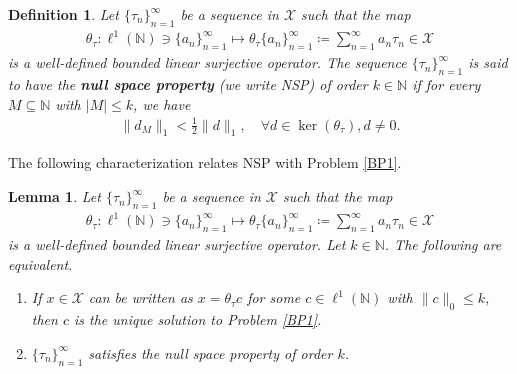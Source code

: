 \documentclass{amsart}
\newtheorem{definition}[theorem]{Definition}
\newtheorem{lemma} [theorem]{Lemma}
\begin{document}
\begin{definition}
Let $\{\tau_n \}_{n=1}^\infty$ be a sequence in  $\mathcal{X}$ such that the map 
\begin{align*}
	\theta_\tau:\ell^1(\mathbb{N})\ni \{a_n \}_{n=1}^\infty\mapsto \theta_\tau \{a_n \}_{n=1}^\infty\coloneqq \sum_{n=1}^{\infty}a_n\tau_n \in \mathcal{X} 
\end{align*}
is a well-defined bounded linear surjective operator. The sequence $\{\tau_n \}_{n=1}^\infty$  is said to have the \textbf{null space property} (we write NSP) of order $k\in \mathbb{N}$ if 	for every $ M \subseteq \mathbb{N} $ with $|M|\leq k$, we have
\begin{align*}
	\|d_M\|_1<\frac{1}{2}\|d\|_1,  \quad  \forall d \in \ker(\theta_\tau), d \neq 0.
\end{align*}
\end{definition}
The following characterization relates NSP with Problem \ref{BP1}.
\begin{lemma}\label{IFF}
Let $\{\tau_n \}_{n=1}^\infty$ be a sequence in  $\mathcal{X}$ such that the map 
\begin{align*}
	\theta_\tau:\ell^1(\mathbb{N})\ni \{a_n \}_{n=1}^\infty\mapsto \theta_\tau \{a_n \}_{n=1}^\infty\coloneqq \sum_{n=1}^{\infty}a_n\tau_n \in \mathcal{X} 
\end{align*}
is a well-defined bounded linear surjective operator. Let $k \in \mathbb{N}$.
 The following are equivalent.
\begin{enumerate}[\upshape(i)]
	\item  If $x \in \mathcal{X}$ can be written as  $	x=\theta_\tau c$ for some  $c \in \ell^1(\mathbb{N})$ with $\|c\|_0\leq k$, then $c$ is the unique solution to Problem \ref{BP1}.
	\item $ \{\tau_n \}_{n=1}^\infty$  satisfies the  null space property  of order $k$.
\end{enumerate}	
\end{lemma}
\end{document}
